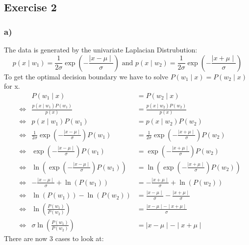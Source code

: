 \documentclass[10pt,a4paper]{article}
\begin{document}
\subsection*{Exercise 2}
\subsubsection*{a)}
The data is generated by the univariate Laplacian Distrubution:
$$p(x\mid w_1) = \frac{1}{2\sigma}\exp\left(-\frac{\mid x - \mu \mid}{\sigma}\right) \textrm{ and } p(x\mid w_2) = \frac{1}{2\sigma}\exp\left(-\frac{\mid x + \mu \mid}{\sigma}\right)$$
To get the optimal decision boundary we have to solve $P(w_1\mid x) = P(w_2 \mid x)$ for x.
\begin{align*}
&& P(w_1 \mid x) &= P(w_2 \mid x) \\
&\Leftrightarrow &\frac{p(x \mid w_1)P(w_1)}{p(x)} &= \frac{p(x \mid w_2)P(w_2)}{p(x)} \\
&\Leftrightarrow &p(x\mid w_1)P(w_1) &= p(x \mid w_2)P(w_2) \\
&\Leftrightarrow &\frac{1}{2\sigma}\exp\left(-\frac{\mid x - \mu \mid}{\sigma}\right)P(w_1) &= \frac{1}{2\sigma}\exp\left(-\frac{\mid x + \mu \mid}{\sigma}\right)P(w_2) \\
&\Leftrightarrow &\exp\left(-\frac{\mid x - \mu \mid}{\sigma}\right)P(w_1) &= \exp\left(-\frac{\mid x + \mu \mid}{\sigma}\right)P(w_2) \\
&\Leftrightarrow &\ln(\exp\left(-\frac{\mid x - \mu \mid}{\sigma}\right)P(w_1)) &= \ln(\exp\left(-\frac{\mid x + \mu \mid}{\sigma}\right)P(w_2)) \\
&\Leftrightarrow &-\frac{\mid x - \mu \mid}{\sigma} + \ln(P(w_1)) &= -\frac{\mid x + \mu \mid}{\sigma} + \ln(P(w_2)) \\
&\Leftrightarrow & \ln(P(w_1)) - \ln(P(w_2)) &= \frac{\mid x - \mu \mid}{\sigma} - \frac{\mid x + \mu \mid}{\sigma} \\
&\Leftrightarrow & \ln\left(\frac{P(w_1)}{P(w_2)}\right) &= \frac{\mid x - \mu \mid - \mid x + \mu \mid}{\sigma} \\
&\Leftrightarrow & \sigma\ln\left(\frac{P(w_1)}{P(w_2)}\right) &= \mid x - \mu \mid - \mid x + \mu \mid
\end{align*}
There are now 3 cases to look at:
\end{document}
